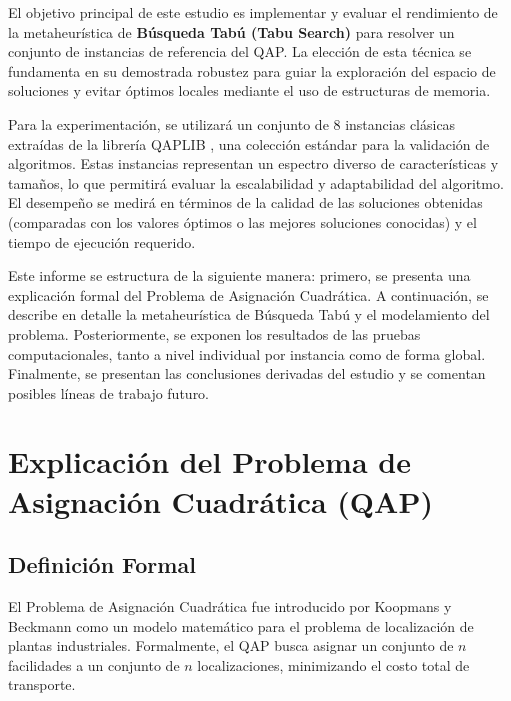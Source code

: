\documentclass[12pt, a4paper]{article}
\begin{document}
El objetivo principal de este estudio es implementar y evaluar el rendimiento de la metaheurística de \textbf{Búsqueda Tabú (Tabu Search)} para resolver un conjunto de instancias de referencia del QAP. La elección de esta técnica se fundamenta en su demostrada robustez para guiar la exploración del espacio de soluciones y evitar óptimos locales mediante el uso de estructuras de memoria.

Para la experimentación, se utilizará un conjunto de 8 instancias clásicas extraídas de la librería QAPLIB \cite{burkard1997qaplib}, una colección estándar para la validación de algoritmos. Estas instancias representan un espectro diverso de características y tamaños, lo que permitirá evaluar la escalabilidad y adaptabilidad del algoritmo. El desempeño se medirá en términos de la calidad de las soluciones obtenidas (comparadas con los valores óptimos o las mejores soluciones conocidas) y el tiempo de ejecución requerido.

Este informe se estructura de la siguiente manera: primero, se presenta una explicación formal del Problema de Asignación Cuadrática. A continuación, se describe en detalle la metaheurística de Búsqueda Tabú y el modelamiento del problema. Posteriormente, se exponen los resultados de las pruebas computacionales, tanto a nivel individual por instancia como de forma global. Finalmente, se presentan las conclusiones derivadas del estudio y se comentan posibles líneas de trabajo futuro.

\newpage

\section{Explicación del Problema de Asignación Cuadrática (QAP)}

\subsection{Definición Formal}

El Problema de Asignación Cuadrática fue introducido por Koopmans y Beckmann \cite{koopmans1957} como un modelo matemático para el problema de localización de plantas industriales. Formalmente, el QAP busca asignar un conjunto de $n$ facilidades a un conjunto de $n$ localizaciones, minimizando el costo total de transporte.
\end{document}
